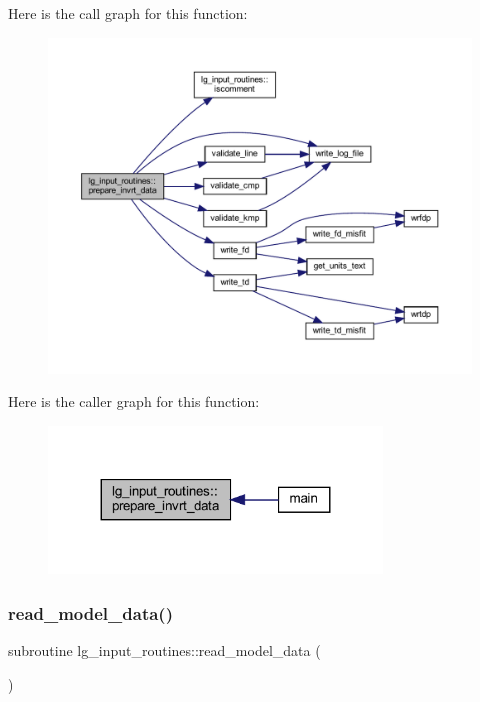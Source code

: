Here is the call graph for this function\+:\nopagebreak
\begin{figure}[H]
\begin{center}
\leavevmode
\includegraphics[width=350pt]{namespacelg__input__routines_a3118d974d52f2c98169709e887ceb344_cgraph}
\end{center}
\end{figure}
Here is the caller graph for this function\+:\nopagebreak
\begin{figure}[H]
\begin{center}
\leavevmode
\includegraphics[width=251pt]{namespacelg__input__routines_a3118d974d52f2c98169709e887ceb344_icgraph}
\end{center}
\end{figure}
\mbox{\label{namespacelg__input__routines_a39e1903280f0492197231ab5fa752f21}} 
\subsubsection{\texorpdfstring{read\+\_\+model\+\_\+data()}{read\_model\_data()}}
{\footnotesize\ttfamily subroutine lg\+\_\+input\+\_\+routines\+::read\+\_\+model\+\_\+data (\begin{DoxyParamCaption}{ }\end{DoxyParamCaption})}

